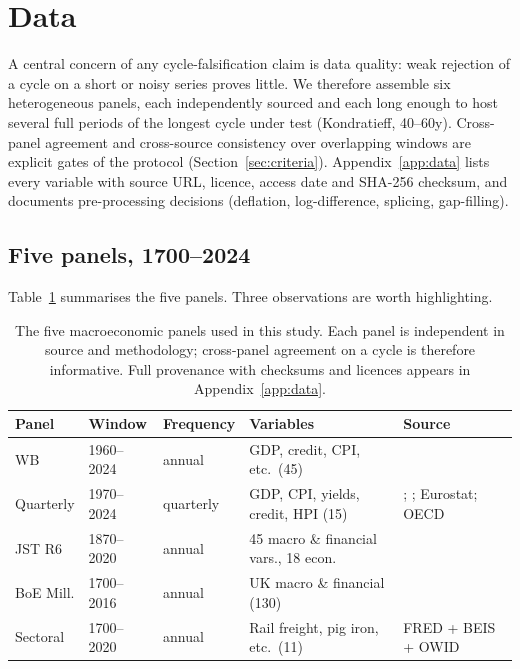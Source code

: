 \section{Data}
\label{sec:data}

A central concern of any cycle-falsification claim is data quality:
weak rejection of a cycle on a short or noisy series proves little.
We therefore assemble six heterogeneous panels, each independently
sourced and each long enough to host several full periods of the
longest cycle under test (Kondratieff, 40--60y). Cross-panel
agreement and cross-source consistency over overlapping windows
are explicit gates of the protocol (Section~\ref{sec:criteria}).
Appendix~\ref{app:data} lists every variable with source URL,
licence, access date and SHA-256 checksum, and documents
pre-processing decisions (deflation, log-difference, splicing,
gap-filling).

\subsection{Five panels, 1700--2024}

Table~\ref{tab:panels} summarises the five panels. Three observations
are worth highlighting.

\begin{table}[t]
\centering
\caption{The five macroeconomic panels used in this study. Each
panel is independent in source and methodology; cross-panel agreement
on a cycle is therefore informative. Full provenance with checksums
and licences appears in Appendix~\ref{app:data}.}
\label{tab:panels}
\small
\begin{tabularx}{\textwidth}{@{}l l l X X@{}}
\toprule
\textbf{Panel} & \textbf{Window} & \textbf{Frequency} & \textbf{Variables} & \textbf{Source} \\
\midrule
WB        & 1960--2024 & annual    & GDP, credit, CPI, etc.\ (45)            & \citet{wb_wdi} \\
Quarterly & 1970--2024 & quarterly & GDP, CPI, yields, credit, HPI (15)      & \citet{bis_credit}; \citet{fred}; Eurostat; OECD \\
JST R6    & 1870--2020 & annual    & 45 macro \& financial vars., 18 econ.\  & \citet{jorda_schularick_taylor2017} \\
BoE Mill. & 1700--2016 & annual    & UK macro \& financial (130)             & \citet{boe_millennium} \\
Sectoral  & 1700--2020 & annual    & Rail freight, pig iron, etc.\ (11)      & FRED + BEIS + OWID \\
\bottomrule
\end{tabularx}
\end{table}

